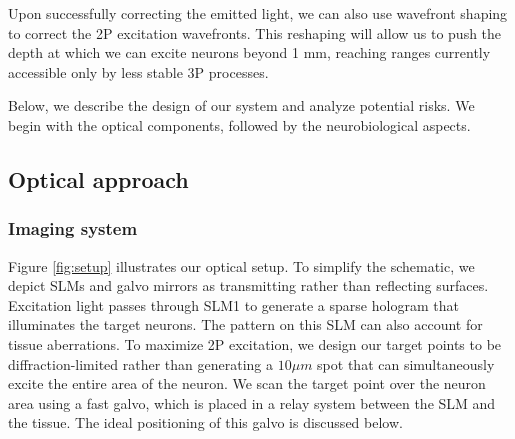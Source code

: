   




Upon successfully correcting the emitted light, we can also use wavefront shaping to correct the 2P excitation wavefronts. This reshaping will allow us to push the depth at which we can excite neurons beyond 1 mm, reaching ranges currently accessible only by less stable 3P processes.



Below, we describe the design of our system and analyze potential risks. We begin with the optical components, followed by the neurobiological aspects.

\subsection{Optical approach}

\subsubsection{Imaging system}
Figure \ref{fig:setup} illustrates our optical setup. To simplify the schematic, we depict SLMs and galvo mirrors as transmitting rather than reflecting surfaces. Excitation light passes through SLM1 to generate a sparse hologram that illuminates the target neurons. The pattern on this SLM can also account for tissue aberrations. To maximize 2P excitation, we design our target points to be diffraction-limited rather than generating a $10\mu m$ spot that can simultaneously excite the entire area of the neuron. We scan the target point over the neuron area using a fast galvo, which is placed in a relay system between the SLM and the tissue. The ideal positioning of this galvo is discussed below.


